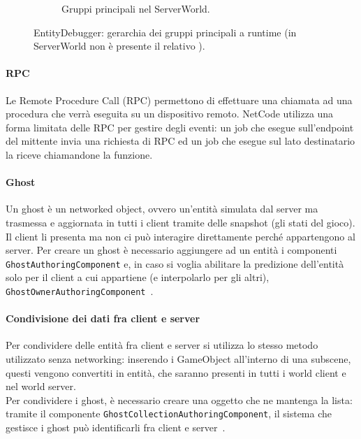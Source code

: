 \begin{figure}[!ht]
\begin{subfigure}{.49\textwidth}
      \caption{Gruppi principali nel ServerWorld.}
      \label{fig:server-world-groups}
    \end{subfigure}
    \caption{EntityDebugger: gerarchia dei gruppi principali a runtime (in ServerWorld non è presente il relativo ).}
    \label{fig:netcode-system-groups}
\end{figure}


\paragraph{RPC}
Le Remote Procedure Call (RPC) permettono di effettuare una chiamata ad una procedura che verrà eseguita su un dispositivo remoto. NetCode utilizza una forma limitata delle RPC per gestire degli eventi: un job che esegue sull'endpoint del mittente invia una richiesta di RPC ed un job che esegue sul lato destinatario la riceve chiamandone la funzione.

\paragraph{Ghost}
Un ghost è un networked object, ovvero un'entità simulata dal server ma trasmessa e aggiornata in tutti i client tramite delle snapshot (gli stati del gioco). Il client li presenta ma non ci può interagire direttamente perché appartengono al server.
Per creare un ghost è necessario aggiungere ad un entità i componenti \verb|GhostAuthoringComponent| e, in caso si voglia abilitare la predizione dell'entità solo per il client a cui appartiene (e interpolarlo per gli altri), \verb|GhostOwnerAuthoringComponent|~\cite{doc:unity-netcode-api}.

\paragraph{Condivisione dei dati fra client e server}
Per condividere delle entità fra client e server si utilizza lo stesso metodo utilizzato senza networking: inserendo i GameObject all'interno di una subscene, questi vengono convertiti in entità, che saranno presenti in tutti i world client e nel world server.\\
Per condividere i ghost, è necessario creare una oggetto che ne mantenga la lista: tramite il componente \verb|GhostCollectionAuthoringComponent|, il sistema che gestisce i ghost può identificarli fra client e server~\cite{doc:unity-netcode-manual}.

